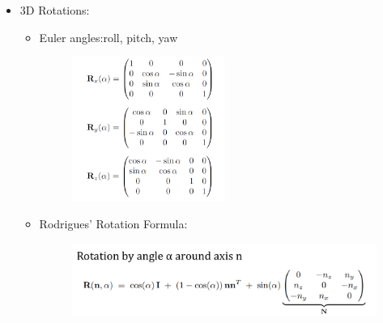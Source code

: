 \documentclass{article}
\begin{document}
\begin{itemize}
\item 3D Rotations: 
\begin{itemize}
    \item Euler angles:roll, pitch, yaw
    \begin{figure}[H]
        \centering
        \includegraphics[width=0.5\textwidth]{imgs/3D_rotation.jpeg}
        
    \end{figure}
    \item Rodrigues' Rotation Formula:
    \begin{figure}[H]
        \centering
        \includegraphics[width=0.6 \textwidth]{imgs/rog_rotation.jpeg}
        
    \end{figure}
\end{itemize}
\end{itemize}
\end{document}

